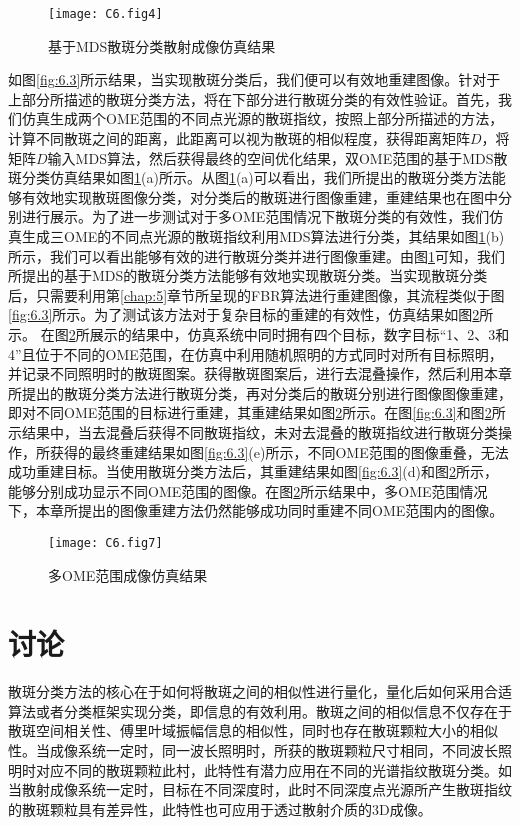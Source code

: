 \begin{figure}[htp!]
	\centering
	\texttt{[image: C6.fig4]}
	\caption{基于MDS散斑分类散射成像仿真结果}
	\label{fig:6.4}
\end{figure}

如图\ref{fig:6.3}所示结果，当实现散斑分类后，我们便可以有效地重建图像。针对于上部分所描述的散斑分类方法，将在下部分进行散斑分类的有效性验证。首先，我们仿真生成两个OME范围的不同点光源的散斑指纹，按照上部分所描述的方法，计算不同散斑之间的距离，此距离可以视为散斑的相似程度，获得距离矩阵$D$，将矩阵$D$输入MDS算法，然后获得最终的空间优化结果，双OME范围的基于MDS散斑分类仿真结果如图\ref{fig:6.4}(a)所示。从图\ref{fig:6.4}(a)可以看出，我们所提出的散斑分类方法能够有效地实现散斑图像分类，对分类后的散斑进行图像重建，重建结果也在图中分别进行展示。为了进一步测试对于多OME范围情况下散斑分类的有效性，我们仿真生成三OME的不同点光源的散斑指纹利用MDS算法进行分类，其结果如图\ref{fig:6.4}(b)所示，我们可以看出能够有效的进行散斑分类并进行图像重建。由图\ref{fig:6.4}可知，我们所提出的基于MDS的散斑分类方法能够有效地实现散斑分类。当实现散斑分类后，只需要利用第\ref{chap:5}章节所呈现的FBR算法进行重建图像，其流程类似于图\ref{fig:6.3}所示。为了测试该方法对于复杂目标的重建的有效性，仿真结果如图\ref{fig:6.7}所示。
在图\ref{fig:6.7}所展示的结果中，仿真系统中同时拥有四个目标，数字目标“1、2、3和4”且位于不同的OME范围，在仿真中利用随机照明的方式同时对所有目标照明，并记录不同照明时的散斑图案。获得散斑图案后，进行去混叠操作，然后利用本章所提出的散斑分类方法进行散斑分类，再对分类后的散斑分别进行图像图像重建，即对不同OME范围的目标进行重建，其重建结果如图\ref{fig:6.7}所示。在图\ref{fig:6.3}和图\ref{fig:6.7}所示结果中，当去混叠后获得不同散斑指纹，未对去混叠的散斑指纹进行散斑分类操作，所获得的最终重建结果如图\ref{fig:6.3}(e)所示，不同OME范围的图像重叠，无法成功重建目标。当使用散斑分类方法后，其重建结果如图\ref{fig:6.3}(d)和图\ref{fig:6.7}所示，能够分别成功显示不同OME范围的图像。在图\ref{fig:6.7}所示结果中，多OME范围情况下，本章所提出的图像重建方法仍然能够成功同时重建不同OME范围内的图像。

\begin{figure}[htp]
	\centering
	\texttt{[image: C6.fig7]}
	\caption{多OME范围成像仿真结果}
	\label{fig:6.7}
\end{figure}


\section{讨论}

散斑分类方法的核心在于如何将散斑之间的相似性进行量化，量化后如何采用合适算法或者分类框架实现分类，即信息的有效利用。散斑之间的相似信息不仅存在于散斑空间相关性、傅里叶域振幅信息的相似性，同时也存在散斑颗粒大小的相似性。当成像系统一定时，同一波长照明时，所获的散斑颗粒尺寸相同，不同波长照明时对应不同的散斑颗粒此村，此特性有潜力应用在不同的光谱指纹散斑分类。如当散射成像系统一定时，目标在不同深度时，此时不同深度点光源所产生散斑指纹的散斑颗粒具有差异性，此特性也可应用于透过散射介质的3D成像。

